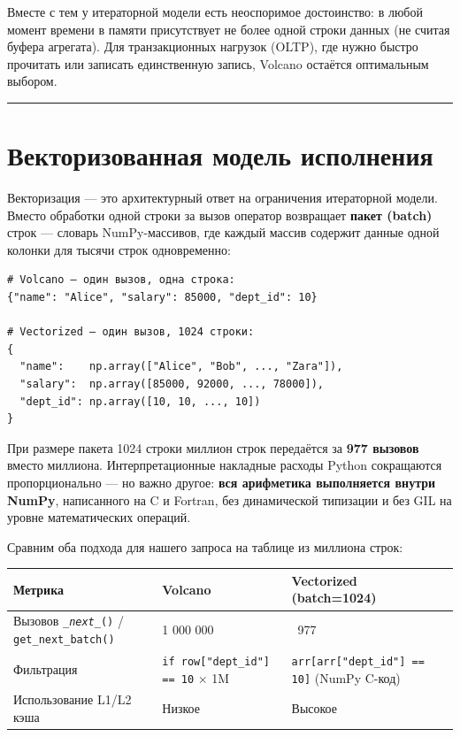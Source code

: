 \documentclass[a4paper,12pt]{report}
\begin{document}
{Вместе с тем у итераторной модели есть неоспоримое достоинство: в любой момент времени в памяти присутствует не более одной строки данных (не считая буфера агрегата). Для транзакционных нагрузок (OLTP), где нужно быстро прочитать или записать единственную запись, Volcano остаётся оптимальным выбором.

\vspace{0.5cm}\hrule\vspace{0.5cm}

\section{Векторизованная модель исполнения}

Векторизация — это архитектурный ответ на ограничения итераторной модели. Вместо обработки одной строки за вызов оператор возвращает \textbf{пакет (batch)} строк — словарь NumPy-массивов, где каждый массив содержит данные одной колонки для тысячи строк одновременно:

\begin{verbatim}
# Volcano — один вызов, одна строка:
{"name": "Alice", "salary": 85000, "dept_id": 10}

# Vectorized — один вызов, 1024 строки:
{
  "name":    np.array(["Alice", "Bob", ..., "Zara"]),
  "salary":  np.array([85000, 92000, ..., 78000]),
  "dept_id": np.array([10, 10, ..., 10])
}
\end{verbatim}

При размере пакета 1024 строки миллион строк передаётся за \textbf{977 вызовов} вместо миллиона. Интерпретационные накладные расходы Python сокращаются пропорционально — но важно другое: \textbf{вся арифметика выполняется внутри NumPy}, написанного на C и Fortran, без динамической типизации и без GIL на уровне математических операций.

Сравним оба подхода для нашего запроса на таблице из миллиона строк:

\begin{longtable}{|l|l|l|}
\hline
Метрика & Volcano & Vectorized (batch=1024) \\ \hline
Вызовов \texttt{\textit{\_next\_}()} / \texttt{get\_next\_batch()} & 1 000 000 & ~977 \\ \hline
Фильтрация & \texttt{if row["dept\_id"] == 10} × 1M & \texttt{arr[arr["dept\_id"] == 10]} (NumPy C-код) \\ \hline
Использование L1/L2 кэша & Низкое & Высокое \\ \hline
\end{longtable}

}
\end{document}
